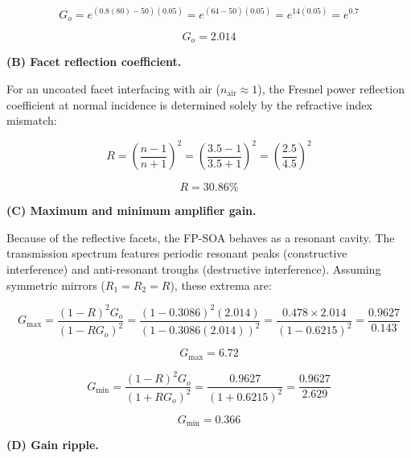 \begin{equation*}
  G_o = e^{(0.8(80) - 50)(0.05)} = e^{(64 - 50)(0.05)} = e^{14(0.05)} = e^{0.7}
\end{equation*}

\begin{equation*}
  \boxed{G_o = 2.014}
\end{equation*}

\textbf{(B) Facet reflection coefficient.}

For an uncoated facet interfacing with air ($n_{\text{air}} \approx 1$), the Fresnel power reflection coefficient at normal incidence is determined solely by the refractive index mismatch:

\begin{equation*}
  R = \left( \frac{n - 1}{n + 1} \right)^2 = \left( \frac{3.5 - 1}{3.5 + 1} \right)^2 = \left( \frac{2.5}{4.5} \right)^2
\end{equation*}

\begin{equation*}
  \boxed{R = 30.86\%}
\end{equation*}

\textbf{(C) Maximum and minimum amplifier gain.}

Because of the reflective facets, the FP-SOA behaves as a resonant cavity. The transmission spectrum features periodic resonant peaks (constructive interference) and anti-resonant troughs (destructive interference). Assuming symmetric mirrors ($R_1 = R_2 = R$), these extrema are:

\begin{equation*}
  G_{\text{max}} = \frac{(1 - R)^2 G_o}{(1 - R G_o)^2} = \frac{(1 - 0.3086)^2 (2.014)}{(1 - 0.3086(2.014))^2} = \frac{0.478 \times 2.014}{(1 - 0.6215)^2} = \frac{0.9627}{0.143}
\end{equation*}

\begin{equation*}
  \boxed{G_{\text{max}} = 6.72}
\end{equation*}

\begin{equation*}
  G_{\text{min}} = \frac{(1 - R)^2 G_o}{(1 + R G_o)^2} = \frac{0.9627}{(1 + 0.6215)^2} = \frac{0.9627}{2.629}
\end{equation*}

\begin{equation*}
  \boxed{G_{\text{min}} = 0.366}
\end{equation*}

\textbf{(D) Gain ripple.}

